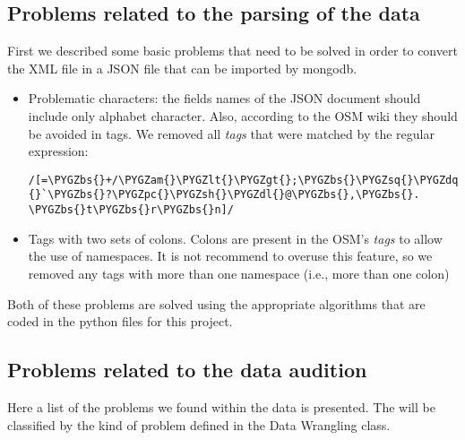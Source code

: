 \documentclass[a4paper,10pt,english]{sphinxhowto}
\def\PYGZbs{\char`\\}
\def\PYGZam{\char`\&}
\def\PYGZlt{\char`\<}
\def\PYGZgt{\char`\>}
\def\PYGZsh{\char`\#}
\def\PYGZpc{\char`\%}
\def\PYGZdl{\char`\$}
\def\PYGZsq{\char`\'}
\def\PYGZdq{\char`\"}
\renewcommand\PYGZsq{\textquotesingle}
\begin{document}
\subsection{Problems related to the parsing of the data}
\label{index:problems-related-to-the-parsing-of-the-data}
First we described some basic problems that need to be solved in order to convert
the XML file in a JSON file that can be imported by mongodb.
\begin{itemize}
\item {} 
Problematic characters: the fields names of the JSON document should include
only alphabet character. Also, according to the OSM wiki they should be avoided
in tags. We removed all \emph{tags} that were matched by the regular expression:

\begin{Verbatim}[commandchars=\\\{\}]
/[=\PYGZbs{}+/\PYGZam{}\PYGZlt{}\PYGZgt{};\PYGZbs{}\PYGZsq{}\PYGZdq{}{}`\PYGZbs{}?\PYGZpc{}\PYGZsh{}\PYGZdl{}@\PYGZbs{},\PYGZbs{}. \PYGZbs{}t\PYGZbs{}r\PYGZbs{}n]/
\end{Verbatim}

\item {} 
Tags with two sets of colons. Colons are present in the OSM's \emph{tags} to allow
the use of namespaces. It is not recommend to overuse this feature, so we
removed any tags with more than one namespace (i.e., more than one colon)

\end{itemize}

Both of these problems are solved using the appropriate algorithms that are
coded in the python files for this project.


\subsection{Problems related to the data audition}
\label{index:problems-related-to-the-data-audition}
Here a list of the problems we found within the data is presented. The will be
classified by the kind of problem defined in the Data Wrangling class.
\end{document}
